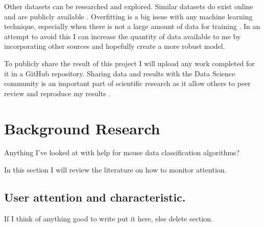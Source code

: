 \documentclass{article}
\begin{document}
Other datasets can be researched and explored.
Similar datasets do exist online and are publicly available \cite{kaggleWorkerActivity}.
Overfitting is a big issue with any machine learning technique, especially when there is not a large amount of data for training \cite{dietterich1995overfitting}.
In an attempt to avoid this I can increase the quantity of data available to me by incorporating other sources and hopefully create a more robust model.



To publicly share the result of this project I will upload any work completed for it in a GitHub repository.
Sharing data and results with the Data Science community is an important part of scientific research as it allow others to peer review and reproduce my results \cite{Birnholtz2003data}.



\section{Background Research}
Anything I've looked at with help for mouse data classification algorithms? 

In this section I will review the literature on how to monitor attention.

\subsection{User attention and characteristic.}

If I think of anything good to write put it here, else delete section.
\end{document}
